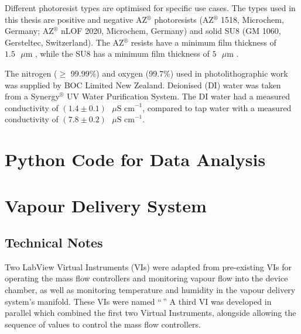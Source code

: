 \documentclass[
  a4paper,
]{scrbook}
\begin{document}
Different photoresist types are optimised for specific use cases. The
types used in this thesis are positive and negative AZ\(^\circledR\)
photoresists (AZ\(^\circledR\) 1518, Microchem, Germany;
AZ\(^\circledR\) nLOF 2020, Microchem, Germany) and solid SU8 (GM 1060,
Gersteltec, Switzerland). The AZ\(^\circledR\) resists have a minimum
film thickness of \(1.5\textrm{ } \mu \textrm{m}\) \autocite{Microchem},
while the SU8 has a minimum film thickness of
\(5\textrm{ } \mu \textrm{m}\) \autocite{SU8}.

The nitrogen (\(\geq\) 99.99\%) and oxygen (99.7\%) used in
photolithographic work was supplied by BOC Limited New Zealand.
Deionised (DI) water was taken from a Synergy\(^\circledR\) UV Water
Purification System. The DI water had a measured conductivity of
\((1.4\pm0.1)\textrm{ } \mu \textrm{S cm}^{-1}\), compared to tap water
with a measured conductivity of
\((7.8\pm0.2)\textrm{ } \mu \textrm{S cm}^{-1}\).

\hypertarget{section}{%
\section{}\label{section}}

\hypertarget{sec-python}{%
\chapter{Python Code for Data Analysis}\label{sec-python}}

\hypertarget{vapour-delivery-system}{%
\chapter{Vapour Delivery System}\label{vapour-delivery-system}}

\hypertarget{technical-notes}{%
\section{Technical Notes}\label{technical-notes}}

Two LabView Virtual Instruments (VIs) were adapted from pre-existing VIs
for operating the mass flow controllers and monitoring vapour flow into
the device chamber, as well as monitoring temperature and humidity in
the vapour delivery system's manifold. These VIs were named ``\,'' A
third VI was developed in parallel which combined the first two Virtual
Instruments, alongside allowing the sequence of values to control the
mass flow controllers.
\end{document}
